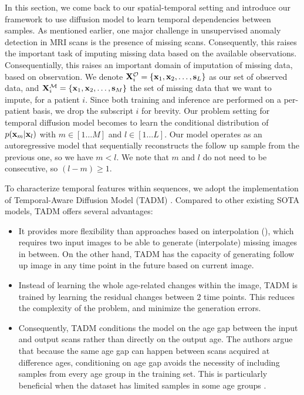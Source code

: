 In this section, we come back to our spatial-temporal setting and introduce our framework to use diffusion model to learn temporal dependencies between samples. As mentioned earlier, one major challenge in unsupervised anomaly detection in MRI scans is the presence of missing scans. Consequently, this raises the important task of imputing missing data based on the available observations. Consequentially, this raises an important domain of imputation of missing data, based on observation. We denote $\mathbf{X}^{\mathcal{O}}_{i} = \{{\mathbf{x}}_1, {\mathbf{x}}_2, \dots, {\mathbf{s}}_L\}$ as our set of observed data, and $\mathbf{X}^{\mathcal{M}}_{i} = \{{\mathbf{x}}_1, {\mathbf{x}}_2, \dots, {\mathbf{s}}_M\}$ the set of missing data that we want to impute, for a patient $i$. Since both training and inference are performed on a per-patient basis, we drop the subscript $i$ for brevity. Our problem setting for temporal diffusion model becomes to learn the conditional distribution of $p({\mathbf{x}}_m | {\mathbf{x}}_l)$ with $m \in [1 \dots M]$ and $l \in [1 \dots L]$. Our model operates as an autoregressive model that sequentially reconstructs the follow up sample from the previous one, so we have $m < l$. We note that $m$ and $l$ do not need to be consecutive, so $(l - m) \geq 1$.


To characterize temporal features within sequences, we adopt the implementation of Temporal-Aware Diffusion Model (TADM) \cite{litricoTADMTemporallyAwareDiffusion2024}. Compared to other existing SOTA models, TADM offers several advantages: 
\begin{itemize}
    \item It provides more flexibility than approaches based on interpolation (\cite{lozuponeLDAE2025}), which requires two input images to be able to generate (interpolate) missing images in between. On the other hand, TADM has the capacity of generating follow up image in any time point in the future based on current image. 
    \item Instead of learning the whole age-related changes within the image, TADM is trained by learning the residual changes between 2 time points. This reduces the complexity of the problem, and minimize the generation errors. 
    \item Consequently, TADM conditions the model on the age gap between the input and output scans rather than directly on the output age. The authors argue that because the same age gap can happen between scans acquired at difference ages, conditioning on age gap avoids the necessity of including samples from every age group in the training set. This is particularly beneficial when the dataset has limited samples in some age groups \cite{litricoTADMTemporallyAwareDiffusion2024}.
\end{itemize}

